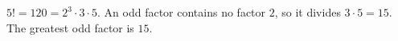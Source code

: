 $5!=120=2^3\cdot3\cdot5$. An odd factor contains no factor $2$, so it divides $3\cdot5=15$. The greatest odd factor is $\boxed{15}$.
